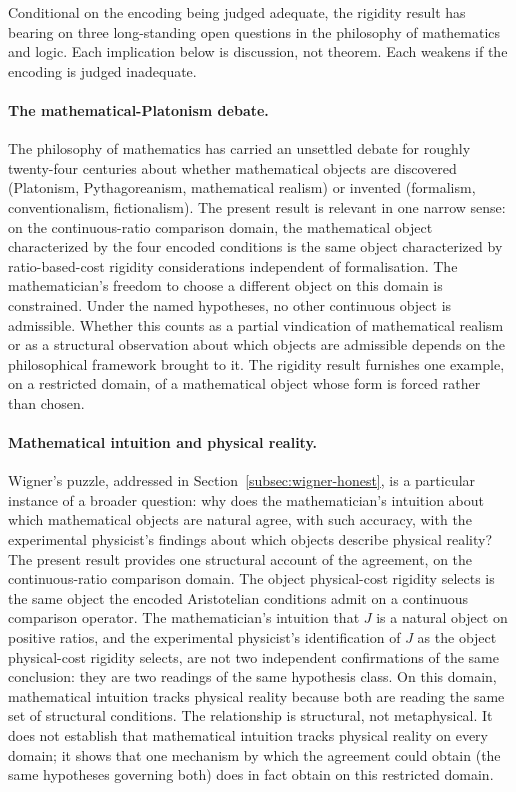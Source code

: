 \documentclass[11pt,a4paper]{article}
\theoremstyle{definition}
\theoremstyle{remark}
\begin{document}
Conditional on the encoding being judged adequate, the rigidity result
has bearing on three long-standing open questions in the philosophy of
mathematics and logic. Each implication below is discussion, not
theorem. Each weakens if the encoding is judged inadequate.

\paragraph{The mathematical-Platonism debate.}
The philosophy of mathematics has carried an unsettled debate for
roughly twenty-four centuries about whether mathematical objects are
discovered (Platonism, Pythagoreanism, mathematical realism) or
invented (formalism, conventionalism, fictionalism). The present
result is relevant in one narrow sense: on the continuous-ratio
comparison domain, the mathematical object characterized by the four
encoded conditions is the same object characterized by
ratio-based-cost rigidity considerations independent of formalisation.
The mathematician's freedom to choose a different object on this
domain is constrained. Under the named hypotheses, no other continuous
object is admissible. Whether this counts as a partial vindication of
mathematical realism or as a structural observation about which
objects are admissible depends on the philosophical framework brought
to it. The rigidity result furnishes one example, on a restricted
domain, of a mathematical object whose form is forced rather than
chosen.

\paragraph{Mathematical intuition and physical reality.}
Wigner's puzzle, addressed in Section~\ref{subsec:wigner-honest}, is a
particular instance of a broader question: why does the mathematician's
intuition about which mathematical objects are natural agree, with such
accuracy, with the experimental physicist's findings about which
objects describe physical reality? The present result provides one
structural account of the agreement, on the continuous-ratio comparison
domain. The object physical-cost rigidity selects is the same object the
encoded Aristotelian conditions admit on a continuous comparison
operator. The mathematician's intuition that $J$ is a natural object on
positive ratios, and the experimental physicist's identification of $J$
as the object physical-cost rigidity selects, are not two independent
confirmations of the same conclusion: they are two readings of the same
hypothesis class. On this domain, mathematical intuition tracks physical
reality because both are reading the same set of structural conditions.
The relationship is structural, not metaphysical. It does not establish
that mathematical intuition tracks physical reality on every domain; it
shows that one mechanism by which the agreement could obtain (the same
hypotheses governing both) does in fact obtain on this restricted
domain.
\end{document}
